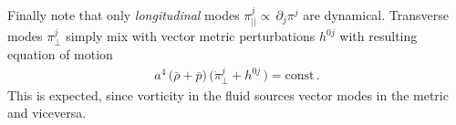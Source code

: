 Finally note that only \emph{longitudinal} modes $\pi^j_{||}\propto\, \partial_j\pi^j$ are dynamical.
Transverse modes $\pi^j_{\perp}$ simply mix with vector metric perturbations $h^{0j}$ with resulting equation of motion
{\small\begin{align}\label{eq:eom_transverse_phonons}
    a^4\,\big(\bar{\rho}+\bar{p}\big)\,\big(\dot{\pi}_\perp^j + h^{0j}\,\big)=\text{const}\,.
\end{align}}
This is expected, since vorticity in the fluid sources vector modes in the metric and viceversa.

















